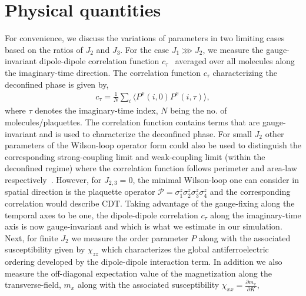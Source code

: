 \section{Physical quantities}
\label{quantities}
For convenience, we discuss the variations of parameters in two limiting cases  based on the ratios of $J_2$ and $J_3$. For the case $J_1\ggg J_2$, we measure the gauge-invariant dipole-dipole correlation function $c_\tau$~\cite{chern2014gauge} averaged over all molecules along the imaginary-time direction. The  correlation function $c_\tau$ characterizing the deconfined phase is given by,
\begin{eqnarray}
c_\tau=\frac{1}{N}\sum_{i}\langle P^x(i,0)P^x(i,\tau) \rangle,
\label{imcor}
\end{eqnarray}
where $\tau$ denotes the imaginary-time index, $N$ being the no. of molecules/plaquettes. The correlation function contains terms that are gauge-invariant and is used to characterize the deconfined phase. For small $J_2$ other parameters of the Wilson-loop operator form could also be used to distinguish the corresponding strong-coupling limit and weak-coupling limit (within the deconfined regime) where the correlation function follows perimeter and area-law respectively~\cite{kogut}. However, for $J_{2,3}=0$, the minimal Wilson-loop one can consider in spatial direction is the plaquette operator $\mathcal{P}=\sigma^z_1\sigma^z_2\sigma^z_3\sigma^z_4$ and the corresponding correlation would describe CDT.  Taking advantage of the gauge-fixing along the temporal axes to be one, the dipole-dipole correlation $c_\tau$ along the imaginary-time axis is now gauge-invariant and which is what we estimate in our simulation. Next, for finite $J_2$ we measure the order parameter $P$ along with the associated susceptibility given by $\chi_{zz}$  which characterizes the global antiferroelectric ordering developed by the dipole-dipole interaction term.
In addition we also measure the off-diagonal expectation value of the magnetization along the transverse-field, $m_x$ along with the associated susceptibility $\chi_{xx}=\frac{\partial m_x}{\partial K}$,

